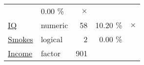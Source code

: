 \documentclass[]{report}
\begin{document}
\begin{longtable}[]{@{}llrrc@{}}
\begin{minipage}[t]{0.17\columnwidth}
\end{minipage} & \begin{minipage}[t]{0.22\columnwidth}\raggedleft\strut
0.00 \%\strut
\end{minipage} & \begin{minipage}[t]{0.14\columnwidth}\centering\strut
\(\times\)\strut
\end{minipage}\tabularnewline
\begin{minipage}[t]{0.16\columnwidth}\raggedright\strut
\protect\hyperlink{iq}{IQ}\strut
\end{minipage} & \begin{minipage}[t]{0.16\columnwidth}\raggedright\strut
numeric\strut
\end{minipage} & \begin{minipage}[t]{0.17\columnwidth}\raggedleft\strut
58\strut
\end{minipage} & \begin{minipage}[t]{0.22\columnwidth}\raggedleft\strut
10.20 \%\strut
\end{minipage} & \begin{minipage}[t]{0.14\columnwidth}\centering\strut
\(\times\)\strut
\end{minipage}\tabularnewline
\begin{minipage}[t]{0.16\columnwidth}\raggedright\strut
\protect\hyperlink{smokes}{Smokes}\strut
\end{minipage} & \begin{minipage}[t]{0.16\columnwidth}\raggedright\strut
logical\strut
\end{minipage} & \begin{minipage}[t]{0.17\columnwidth}\raggedleft\strut
2\strut
\end{minipage} & \begin{minipage}[t]{0.22\columnwidth}\raggedleft\strut
0.00 \%\strut
\end{minipage} & \begin{minipage}[t]{0.14\columnwidth}\centering\strut
\strut
\end{minipage}\tabularnewline
\begin{minipage}[t]{0.16\columnwidth}\raggedright\strut
\protect\hyperlink{income}{Income}\strut
\end{minipage} & \begin{minipage}[t]{0.16\columnwidth}\raggedright\strut
factor\strut
\end{minipage} & \begin{minipage}[t]{0.17\columnwidth}\raggedleft\strut
901\strut
\end{minipage} & \begin{minipage}[t]{0.22\columnwidth}\raggedleft\strut

\end{minipage}
\end{longtable}
\end{document}
